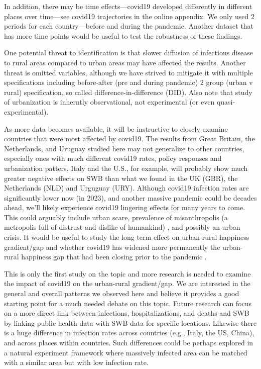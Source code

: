 \documentclass[10pt, letterpaper]{article}
\begin{document}
\begin{spacing}{1.4}
In addition, there may be time effects---covid19 developed differently in different places over
time---see covid19 trajectories in the online appendix. We only used 2 periods for each
country---before and during the pandemic. Another dataset that has more time points would be
useful to test the robustness of these findings.

{One potential threat to identification is that slower diffusion of infectious disease to rural areas compared to urban areas
may have affected the results. Another threat is omitted
variables, although we have strived to mitigate it with multiple
specifications including before-after (pre and during pandemic)
 2 group (urban v rural) specification, so called difference-in-difference (DID). Also note that study of urbanization is inherntly observational,
not experimental (or even quasi-experimental).}

As more data becomes available, it will be instructive to closely examine
countries that were most affected by covid19. The results from Great
 Britain, the Netherlands, and Uruguay studied here may not generalize to other
 countries, especially ones with much different covid19 rates, policy responses
 and urbanization patters. Italy and the U.S., for example,
will probably show much greater negative effects on SWB than what we found in
the UK (GBR), the Netherlands (NLD) and Urguguay (URY). Although covid19
infection rates are significantly lower now (in 2023),
and another massive pandemic could be decades ahead, we'll likely experience
covid19 lingering effects for many years to come. This could arguably include
urban scare, prevalence of misanthropolis (a metropolis full of distrust and
dislike of humankind) \citep{aok22}, and possibly an urban crisis. It would be
useful to study the long term effect on urban-rural happiness gradient/gap and whether covid19
has widened more permanently the urban-rural happiness gap that had been closing prior to the pandemic
\citep{aok-swbGenYcity18}.

This is only the first study on the topic and more research is needed to examine
the impact of covid19 on the urban-rural gradient/gap. We are interested in the
general and overall patterns we observed here and believe it provides a good
starting point for a much needed debate on this topic. Future research can focus
on a more direct link between infections, hospitalizations, and deaths and SWB
by linking public health data with SWB data for specific locations. Likewise
there is a huge difference in infection rates across countries (e.g., Italy, the
US, China), and across places within countries. Such differences could be
perhaps explored in a natural experiment framework where massively infected area
can be matched with a similar area but with low infection rate.



\end{spacing}
\end{document}
